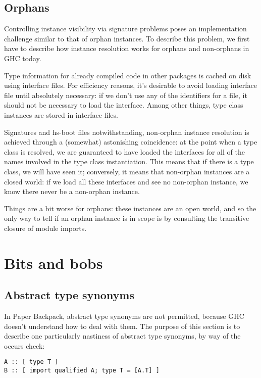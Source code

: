 \documentclass{article}
\begin{document}
\subsection{Orphans}

Controlling instance visibility via signature problems poses an implementation
challenge similar to that of orphan instances.  To describe this problem,
we first have to describe how instance resolution works for orphans and
non-orphans in GHC today.

Type information for already compiled code in other packages is cached
on disk using interface files.  For efficiency reasons, it's desirable to
avoid loading interface file until absolutely necessary: if we don't
use any of the identifiers for a file, it should not be necessary to
load the interface.  Among other things, type class instances are stored
in interface files.

Signatures and hs-boot files notwithstanding, non-orphan instance
resolution is achieved through a (somewhat) astonishing coincidence: at
the point when a type class is resolved, we are guaranteed to have
loaded the interfaces for all of the names involved in the type class
instantiation.  This means that if there is a type class, we will have
seen it; conversely, it means that non-orphan instances are a closed
world: if we load all these interfaces and see no non-orphan instance,
we know there never be a non-orphan instance.

Things are a bit worse for orphans: these instances are an open world,
and so the only way to tell if an orphan instance is in scope is by consulting
the transitive closure of module imports.

\section{Bits and bobs}

\subsection{Abstract type synonyms}

In Paper Backpack, abstract type synonyms are not permitted, because GHC doesn't
understand how to deal with them.  The purpose of this section is to describe
one particularly nastiness of abstract type synonyms, by way of the occurs check:

\begin{verbatim}
A :: [ type T ]
B :: [ import qualified A; type T = [A.T] ]
\end{verbatim}
\end{document}
